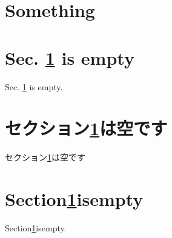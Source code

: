 \documentclass[twocolumn]{jarticle}
\begin{document}
\tableofcontents
\section{Something}\label{a}
\section{Sec. \ref{a} is empty}
Sec. \ref{a} is empty.
\section{セクション\ref{a}は空です}
セクション\ref{a}は空です
\section{Section\ref{a}isempty}
Section\ref{a}isempty.
\end{document}
